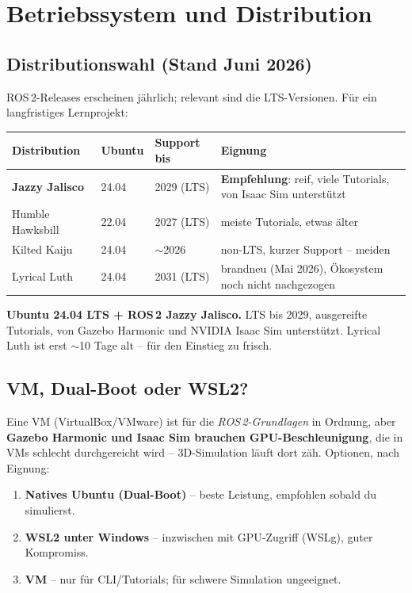 
\chapter{Betriebssystem und Distribution}

\section{Distributionswahl (Stand Juni 2026)}
ROS\,2-Releases erscheinen jährlich; relevant sind die LTS-Versionen. Für ein
langfristiges Lernprojekt:
\begin{longtable}{@{}p{3.4cm}p{2.6cm}p{2.4cm}p{6cm}@{}}
\toprule
\textbf{Distribution} & \textbf{Ubuntu} & \textbf{Support bis} & \textbf{Eignung} \\
\midrule
\textbf{Jazzy Jalisco} & 24.04 & 2029 (LTS) & \textbf{Empfehlung}: reif, viele Tutorials, von Isaac Sim unterstützt \\
Humble Hawksbill       & 22.04 & 2027 (LTS) & meiste Tutorials, etwas älter \\
Kilted Kaiju           & 24.04 & $\sim$2026 & non-LTS, kurzer Support -- meiden \\
Lyrical Luth           & 24.04 & 2031 (LTS) & brandneu (Mai 2026), Ökosystem noch nicht nachgezogen \\
\bottomrule
\end{longtable}

\begin{infobox}[title=Empfehlung]
\textbf{Ubuntu 24.04 LTS + ROS\,2 Jazzy Jalisco.} LTS bis 2029, ausgereifte
Tutorials, von Gazebo Harmonic und NVIDIA Isaac Sim unterstützt. Lyrical Luth
ist erst $\sim$10 Tage alt -- für den Einstieg zu frisch.
\end{infobox}

\section{VM, Dual-Boot oder WSL2?}
\begin{warnbox}[title=Wichtige Einschränkung bei der VM]
Eine VM (VirtualBox/VMware) ist für die \emph{ROS\,2-Grundlagen} in Ordnung,
aber \textbf{Gazebo Harmonic und Isaac Sim brauchen GPU-Beschleunigung}, die in
VMs schlecht durchgereicht wird -- 3D-Simulation läuft dort zäh. Optionen,
nach Eignung:
\begin{enumerate}
\item \textbf{Natives Ubuntu (Dual-Boot)} -- beste Leistung, empfohlen sobald du
  simulierst.
\item \textbf{WSL2 unter Windows} -- inzwischen mit GPU-Zugriff (WSLg), guter
  Kompromiss.
\item \textbf{VM} -- nur für CLI/Tutorials; für schwere Simulation ungeeignet.
\end{enumerate}
\end{warnbox}
